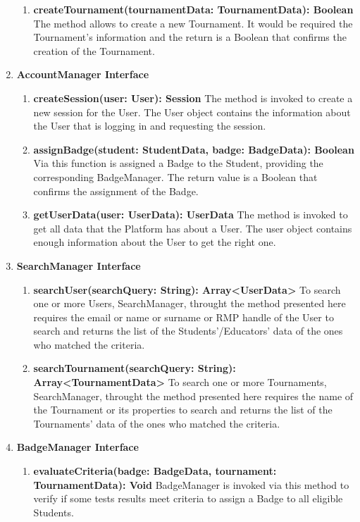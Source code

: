 \begin{enumerate}
\begin{enumerate}[label=$\bullet$]
            \item \textbf{createTournament(tournamentData: TournamentData): Boolean} The method allows to create a new Tournament. It would be required the Tournament's information and the return is a Boolean that confirms the creation of the Tournament.
        \end{enumerate}
    \item \textbf{AccountManager Interface} 
        \begin{enumerate}[label=$\bullet$]
            \item \textbf{createSession(user: User): Session} The method is invoked to create a new session for the User. The User object contains the information about the User that is logging in and requesting the session.
            \item \textbf{assignBadge(student: StudentData, badge: BadgeData): Boolean} Via this function is assigned a Badge to the Student, providing the corresponding BadgeManager. The return value is a Boolean that confirms the assignment of the Badge.
            \item \textbf{getUserData(user: UserData): UserData} The method is invoked to get all data that the Platform has about a User. The user object contains enough information about the User to get the right one.
        \end{enumerate}
    \item \textbf{SearchManager Interface} 
        \begin{enumerate}[label=$\bullet$]
            \item \textbf{searchUser(searchQuery: String): Array<UserData>} To search one or more Users, SearchManager, throught the method presented here requires the email or name or surname or RMP handle of the User to search and returns the list of the Students'/Educators' data of the ones who matched the criteria.
            \item \textbf{searchTournament(searchQuery: String): Array<TournamentData> } To search one or more Tournaments, SearchManager, throught the method presented here requires the name of the Tournament or its properties to search and returns the list of the Tournaments' data of the ones who matched the criteria.
        \end{enumerate}
    \item \textbf{BadgeManager Interface}
        \begin{enumerate}[label=$\bullet$]
            \item \textbf{evaluateCriteria(badge: BadgeData, tournament: TournamentData): Void} BadgeManager is invoked via this method to verify if some tests results meet criteria to assign a Badge to all eligible Students.

\end{enumerate}
\end{enumerate}
